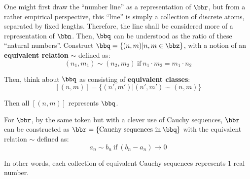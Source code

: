 One might first draw the ``number line'' as a representation of \(\bbr\), but from a rather empirical perspective, this ``line'' is simply a collection of discrete atoms, separated by fixed lengths. Therefore, the line shall be considered more of a representation of \(\bbn\). Then, \(\bbq\) can be understood as the ratio of these ``natural numbers''. Construct \(\bbq = \{(n, m) | n, m \in \bbz\}\), with a notion of an \textbf{equivalent relation} \(\sim\) defined as: \[
    (n_1, m_1) \sim (n_2, m_2) \:\text{if}\: n_1 \cdot m_2 = m_1 \cdot n_2
\]

Then, think about \(\bbq\) as consisting of \textbf{equivalent classes}: \[
[(n, m)] = \{(n', m') | (n', m') \sim (n, m)\}
\]

Then all \([(n, m)]\) represents \(\bbq\).

For \(\bbr\), by the same token but with a clever use of Cauchy sequences, \(\bbr\) can be constructed as \(\bbr = \{\text{Cauchy sequences in}\: \bbq\}\) with the equivalent relation \(\sim\) defined as: \[
a_n \sim b_n \:\text{if}\: (b_n - a_n) \rightarrow 0
\]

In other words, each collection of equivalent Cauchy sequences represents 1 real number.

